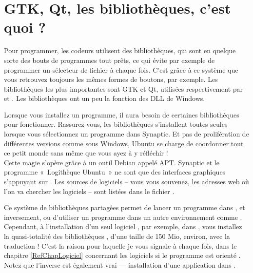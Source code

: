 \section{GTK, Qt, les bibliothèques, c'est quoi ?}
\label{RefLibGraphique}
Pour programmer, les codeurs utilisent des bibliothèques, qui sont en quelque sorte des bouts de programmes tout prêts, ce qui évite par exemple de programmer un sélecteur de fichier à chaque fois. C'est grâce à ce système que vous retrouvez toujours les mêmes formes de boutons, par exemple. Les bibliothèques les plus importantes sont GTK et Qt, utilisées respectivement par  et . Les bibliothèques ont un peu la fonction des DLL de Windows. \par
Lorsque vous installez un programme, il aura besoin de certaines bibliothèques pour fonctionner. Rassurez vous, les bibliothèques s'installent toutes seules lorsque vous sélectionnez un programme dans Synaptic. Et pas de prolifération de différentes versions comme sous Windows, Ubuntu se charge de coordonner tout ce petit monde sans même que vous ayez à y réfléchir !\\
Cette magie s'opère grâce à un outil Debian appelé APT. Synaptic et le programme «~Logithèque Ubuntu~» ne sont que des interfaces graphiques s'appuyant sur . Les sources de logiciels -- vous vous souvenez, les adresses web où l'on va chercher les logiciels -- sont listées dans le fichier  .\par
Ce système de bibliothèques partagées permet de lancer un programme  dans , et inversement, ou d'utiliser un programme  dans un autre environnement comme . Cependant, à l'installation d'un seul logiciel , par exemple, dans , vous installez la quasi-totalité des bibliothèques , d'une taille de 150 Mio, environ, avec la traduction ! C'est la raison pour laquelle je vous signale à chaque fois, dans le chapitre \ref{RefChapLogiciel} concernant les logiciels si le programme est orienté . Notez que l'inverse est également vrai --- installation d'une application  dans .
